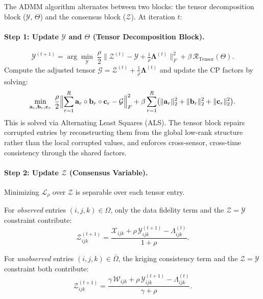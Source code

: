 \documentclass[journal]{IEEEtran}
\newcommand{\Xcal}{\mathcal{X}}
\newcommand{\Zcal}{\mathcal{Z}}
\newcommand{\Ycal}{\mathcal{Y}}
\newcommand{\Wcal}{\mathcal{W}}
\newcommand{\Gcal}{\mathcal{G}}
\newcommand{\Lcal}{\mathcal{L}}
\newcommand{\Rcal}{\mathcal{R}}
\newcommand{\Omegaobs}{\Omega}
\newcommand{\Omegamis}{\bar{\Omega}}
\begin{document}
The ADMM algorithm alternates between two blocks: the tensor decomposition block ($\Ycal$, $\Theta$) and the consensus block ($\Zcal$). At iteration $t$:

\paragraph{Step 1: Update $\Ycal$ and $\Theta$ (Tensor Decomposition Block).}
\begin{equation}\label{eq:update_Y}
\Ycal^{(t+1)} = \arg\min_{\Ycal}\; \frac{\rho}{2}\bigl\|\Zcal^{(t)} - \Ycal + \tfrac{1}{\rho}\boldsymbol{\Lambda}^{(t)}\bigr\|_{F}^{2} + \beta\,\Rcal_{\mathrm{Tensor}}(\Theta).
\end{equation}
Compute the adjusted tensor $\Gcal = \Zcal^{(t)} + \frac{1}{\rho}\boldsymbol{\Lambda}^{(t)}$ and update the CP factors by solving:
\begin{equation}\label{eq:cp_update}
\min_{\mathbf{a}_r, \mathbf{b}_r, \mathbf{c}_r}\; \frac{\rho}{2}\Bigl\|\sum_{r=1}^{R} \mathbf{a}_r \circ \mathbf{b}_r \circ \mathbf{c}_r - \Gcal\Bigr\|_{F}^{2} + \beta\sum_{r=1}^{R}\bigl(\|\mathbf{a}_r\|_2^2 + \|\mathbf{b}_r\|_2^2 + \|\mathbf{c}_r\|_2^2\bigr).
\end{equation}
This is solved via Alternating Least Squares (ALS). The tensor block repairs corrupted entries by reconstructing them from the global low-rank structure rather than the local corrupted values, and enforces cross-sensor, cross-time consistency through the shared factors.

\paragraph{Step 2: Update $\Zcal$ (Consensus Variable).}
Minimizing $\Lcal_\rho$ over $\Zcal$ is separable over each tensor entry.

For \emph{observed} entries $(i,j,k) \in \Omegaobs$, only the data fidelity term and the $\Zcal = \Ycal$ constraint contribute:
\begin{equation}\label{eq:Z_obs}
\Zcal_{ijk}^{(t+1)} = \frac{\Xcal_{ijk} + \rho\,\Ycal_{ijk}^{(t+1)} - \Lambda_{ijk}^{(t)}}{1 + \rho}.
\end{equation}

For \emph{unobserved} entries $(i,j,k) \in \Omegamis$, the kriging consistency term and the $\Zcal = \Ycal$ constraint both contribute:
\begin{equation}\label{eq:Z_mis}
\Zcal_{ijk}^{(t+1)} = \frac{\gamma\,\Wcal_{ijk} + \rho\,\Ycal_{ijk}^{(t+1)} - \Lambda_{ijk}^{(t)}}{\gamma + \rho}.
\end{equation}
\end{document}
